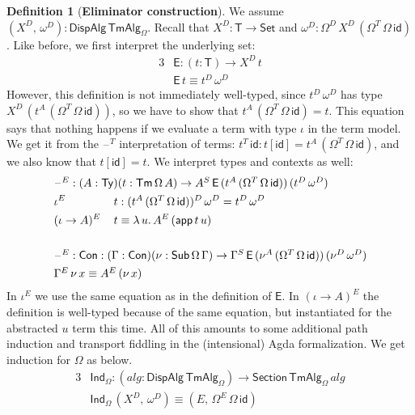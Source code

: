 \documentclass[12pt,a4paper,twoside,openany]{book}
\theoremstyle{remark}
\theoremstyle{definition}
\newtheorem{mydefinition}{Definition}
\newcommand{\mi}[1]{\mathit{#1}}
\newcommand{\ms}[1]{\mathsf{#1}}
\newcommand{\id}{\mathsf{id}}
\newcommand{\Con}{\mathsf{Con}}
\newcommand{\Sub}{\mathsf{Sub}}
\newcommand{\Tm}{\mathsf{Tm}}
\newcommand{\Ty}{\mathsf{Ty}}
\newcommand{\blank}{\mathord{\hspace{1pt}\text{--}\hspace{1pt}}}
\newcommand{\Set}{\mathsf{Set}}
\newcommand{\app}{\ms{app}}
\newcommand{\DispAlg}{\ms{DispAlg}}
\newcommand{\Section}{\ms{Section}}
\newcommand{\TmAlg}{\ms{TmAlg}}
\newcommand{\Ind}{\ms{Ind}}
\begin{document}
\begin{mydefinition}[\textbf{Eliminator construction}]
We assume $(X^D,\,\omega^D) : \DispAlg\,\TmAlg_\Omega$. Recall that $X^D :
\ms{T} \to \Set$ and $\omega^D : \Omega^D\,X^D\,(\Omega^T\,\Omega\,\id)$. Like
before, we first interpret the underlying set:
\begin{alignat*}{3}
  & \ms{E} : (t : \ms{T}) \to X^D\,t \\
  & \ms{E}\,t \equiv t^D\,\omega^D
\end{alignat*}
However, this definition is not immediately well-typed, since $t^D\,\omega^D$
has type $X^D\,(t^A\,(\Omega^T\,\Omega\,\id))$, so we have to show that
$t^A\,(\Omega^T\,\Omega\,\id) = t$. This equation says that nothing happens if
we evaluate a term with type $\iota$ in the term model. We get it from the
$\blank^T$ interpretation of terms: $t^T\,\id : t[\id] =
t^A\,(\Omega^T\,\Omega\,\id)$, and we also know that $t[\id] = t$. We interpret types
and contexts as well:
\begin{alignat*}{3}
  & \hspace{-8em}\rlap{$\blank^E : (A : \Ty)(t : \Tm\,\Omega\,A) \to A^S\,\ms{E}\,(t^A\,(\Omega^T\,\Omega\,\id))\,(t^D\,\omega^D)$}\\
  & \hspace{-8em}\iota^E\,&&t : (t^A\,(\Omega^T\,\Omega\,\id))^D\,\omega^D = t^D\,\omega^D\\
  & \hspace{-8em}(\iota\to A)^E\,&&t \equiv \lambda\,u.\, A^E\,(\app\,t\,u)\\
  & \hspace{-8em}&& \\
  & \hspace{-8em}\rlap{$\blank^E : \Con : (\Gamma : \Con)(\nu : \Sub\,\Omega\,\Gamma) \to \Gamma^S\,\ms{E}\,(\nu^A\,(\Omega^T\,\Omega\,\id))\, (\nu^D\,\omega^D)$}\\
  & \hspace{-8em}\rlap{$\Gamma^E\,\nu\,x \equiv A^E\,(\nu\,x)$}
\end{alignat*}
In $\iota^E$ we use the same equation as in the definition of $\ms{E}$. In
$(\iota\to A)^E$ the definition is well-typed because of the same equation, but
instantiated for the abstracted $u$ term this time. All of this amounts to some
additional path induction and transport fiddling in the (intensional) Agda
formalization. We get induction for $\Omega$ as below.
\begin{alignat*}{3}
  &\Ind_{\Omega} : (\mi{alg} : \DispAlg\,\TmAlg_\Omega) \to \Section\,\TmAlg_\Omega\,\mi{alg}\\
  &\Ind_{\Omega}\,(X^D,\,\omega^D) \equiv (E,\, \Omega^E\,\Omega\,\id)
\end{alignat*}
\end{mydefinition}
\end{document}
